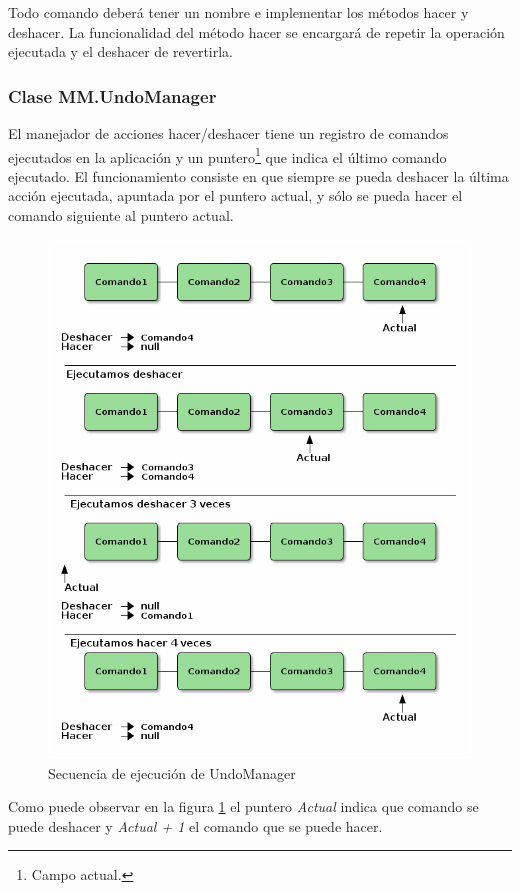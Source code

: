 Todo comando deberá tener un nombre e implementar los métodos hacer y deshacer. La funcionalidad del 
método hacer se encargará de repetir la operación ejecutada y el deshacer de revertirla.

\subsubsection{Clase MM.UndoManager}

El manejador de acciones hacer/deshacer tiene un registro de comandos ejecutados en la aplicación y un puntero\footnote{Campo actual.} que indica el último comando ejecutado. El funcionamiento consiste en que siempre se pueda deshacer la última acción ejecutada, apuntada por el puntero actual, y sólo se pueda hacer el comando siguiente al puntero actual.

\begin{figure}[tbph]
\centering
\includegraphics[width=0.7\linewidth]{imagenes/undomangerEjecucion.png}
\caption{Secuencia de ejecución de UndoManager}
\label{fig:undomanager-ejecucion-concepto}
\end{figure}
 
Como puede observar en la figura \ref{fig:undomanager-ejecucion-concepto} el puntero \textit{Actual} indica que comando se puede deshacer y \textit{Actual + 1} el comando que se puede hacer. 

